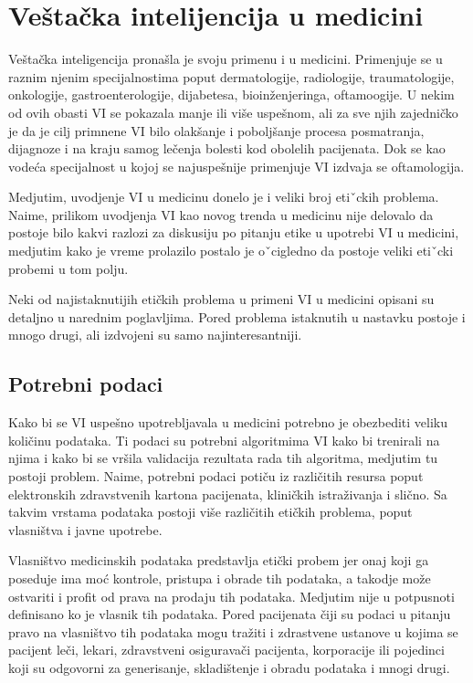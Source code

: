\documentclass[a4paper]{article}
\begin{document}

\section{Veštačka intelijencija u medicini}
\label{sec:upotreba_veštačke_intelijencije_u_medicini}

Veštačka inteligencija pronašla je svoju primenu i u medicini. Primenjuje se u raznim njenim specijalnostima poput dermatologije, radiologije, traumatologije, onkologije, gastroenterologije, dijabetesa, bioinženjeringa, oftamoogije. U nekim od ovih obasti VI se pokazala manje ili više uspešnom, ali za sve njih zajedničko je da je cilj primnene VI bilo olakšanje i poboljšanje procesa  posmatranja, dijagnoze i na kraju samog lečenja bolesti kod obolelih pacijenata. Dok se kao vodeća specijalnost u kojoj se najuspešnije primenjuje VI izdvaja se oftamologija.

Medjutim, uvodjenje VI u medicinu donelo je i veliki broj etiˇckih problema. Naime, prilikom uvodjenja VI kao novog trenda u medicinu nije delovalo da postoje bilo kakvi razlozi za diskusiju po pitanju etike u upotrebi VI u medicini, medjutim kako je vreme prolazilo postalo je oˇcigledno da postoje veliki etiˇcki probemi u tom polju.

Neki od najistaknutijih etičkih problema u primeni VI u medicini opisani su detaljno u narednim poglavljima. Pored problema istaknutih u nastavku postoje i mnogo drugi, ali izdvojeni su samo najinteresantniji.

\subsection{Potrebni podaci}
\label{subsec:poreklo_podataka}

Kako bi se VI uspešno upotrebljavala u medicini potrebno je obezbediti veliku količinu podataka. Ti podaci su potrebni algoritmima VI kako bi trenirali na njima i kako bi se vršila validacija rezultata rada tih algoritma, medjutim tu postoji problem. Naime, potrebni podaci potiču iz različitih resursa poput elektronskih zdravstvenih kartona pacijenata, kliničkih istraživanja i slično. Sa takvim vrstama podataka postoji više različitih etičkih problema, poput vlasništva i javne upotrebe.

Vlasništvo medicinskih podataka predstavlja etički probem jer onaj koji ga poseduje ima moć kontrole, pristupa i obrade tih podataka, a takodje može ostvariti i profit od prava na prodaju tih podataka. Medjutim nije u potpusnoti definisano ko je vlasnik tih podataka. Pored pacijenata čiji su podaci u pitanju pravo na vlasništvo tih podataka mogu tražiti i zdrastvene ustanove u kojima se pacijent leči, lekari, zdravstveni osiguravači pacijenta, korporacije ili pojedinci koji su odgovorni za generisanje, skladištenje i obradu podataka i mnogi drugi.
\end{document}
